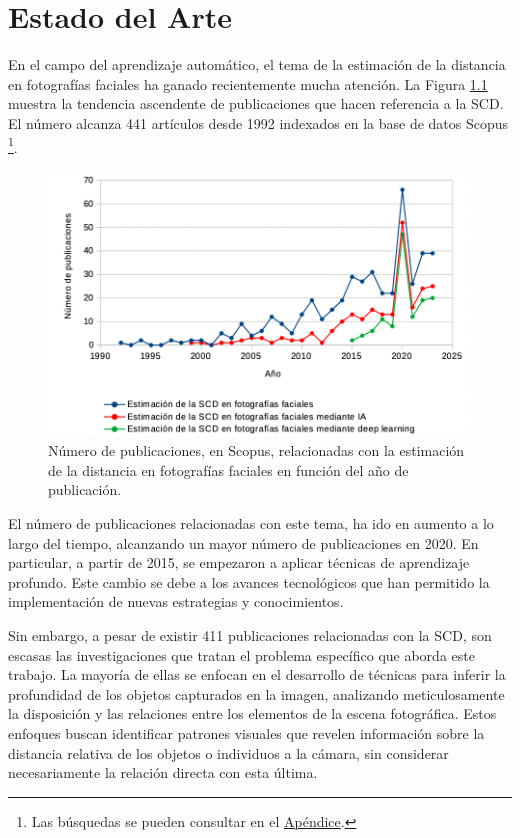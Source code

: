 \chapter{Estado del Arte}
\thispagestyle{empty}

En el campo del aprendizaje automático, el tema de la estimación de la distancia en fotografías faciales ha ganado recientemente mucha atención. La Figura \ref{fig16} muestra la tendencia ascendente de publicaciones que hacen referencia a la SCD. El número alcanza 441 artículos desde 1992 indexados en la base de datos Scopus \footnote{Las búsquedas se pueden consultar en el \hyperref[scopus]{Apéndice}.}.

\begin{figure}[H]
	\centering
	\includegraphics[scale=0.8]{imagenes/cap3/grafica_scopus6.png}
	\caption[Número de publicaciones sobre la estimación de la SCD.]{Número de publicaciones, en Scopus, relacionadas con la estimación de la distancia en fotografías faciales en función del año de publicación.}
	\label{fig16}
\end{figure}

El número de publicaciones relacionadas con este tema, ha ido en aumento a lo largo del tiempo, alcanzando un mayor número de publicaciones en 2020. En particular, a partir de 2015, se empezaron a aplicar técnicas de aprendizaje profundo. Este cambio se debe a los avances tecnológicos que han permitido la implementación de nuevas estrategias y conocimientos.

Sin embargo, a pesar de existir 411 publicaciones relacionadas con la SCD, son escasas las investigaciones que tratan el problema específico que aborda este trabajo. La mayoría de ellas se enfocan en el desarrollo de técnicas para inferir la profundidad de los objetos capturados en la imagen, analizando meticulosamente la disposición y las relaciones entre los elementos de la escena fotográfica. Estos enfoques buscan identificar patrones visuales que revelen información sobre la distancia relativa de los objetos o individuos a la cámara, sin considerar necesariamente la relación directa con esta última.


